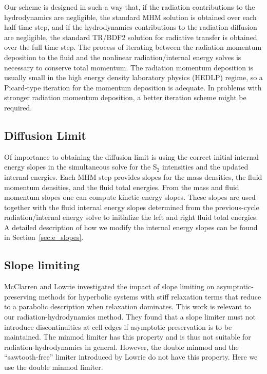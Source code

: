 \documentclass[preprint,12pt]{elsarticle}
\begin{document}
Our scheme is designed in such a way that, 
if the radiation contributions to the hydrodynamics are negligible, the standard MHM solution is obtained over each half time step, and if the hydrodynamics contributions to 
the radiation diffusion are negligible, the standard TR/BDF2 solution for radiative transfer is obtained over the full time step.  The process of iterating 
between the radiation momentum deposition to the fluid and the nonlinear radiation/internal energy solves is necessary to conserve total momentum.  
The radiation momentum deposition is usually small in the high energy density laboratory physics (HEDLP) regime, so a Picard-type iteration for the
momentum deposition is adequate.  In problems 
with stronger radiation momentum deposition, a better iteration scheme might be required. 


\subsection{Diffusion Limit}
\label{sec:diffusion-limit}
Of importance to obtaining the diffusion limit is using the correct initial internal energy slopes in the simultaneous solve for the 
S$_2$ intensities and the updated internal energies.  Each MHM step provides slopes for the mass densities, the fluid momentum densities, 
and the fluid total energies.  From the mass and fluid momentum slopes one can compute kinetic energy slopes.  These slopes are used 
together with the fluid internal energy slopes determined from the previous-cycle radiation/internal energy solve to initialize the left and right 
fluid total energies. A detailed description of how we modify the internal energy slopes can be found in Section~\ref{sec:e_slopes}.

\subsection{Slope limiting}
McClarren and Lowrie \cite{mclow2008} investigated the impact of slope limiting on asymptotic-preserving methods for hyperbolic systems with stiff 
relaxation terms that reduce to a parabolic description when relaxation dominates.  This work is relevant to our radiation-hydrodynamics method. 
They found that a slope limiter must not introduce discontinuities at cell edges if asymptotic preservation is to be maintained.  The minmod limiter 
has this property and is thus not suitable for radiation-hydrodynamics in general.  However, the double minmod and the ``sawtooth-free'' limiter 
introduced by Lowrie do not have this property.  Here we use the double minmod limiter.   
\end{document}
